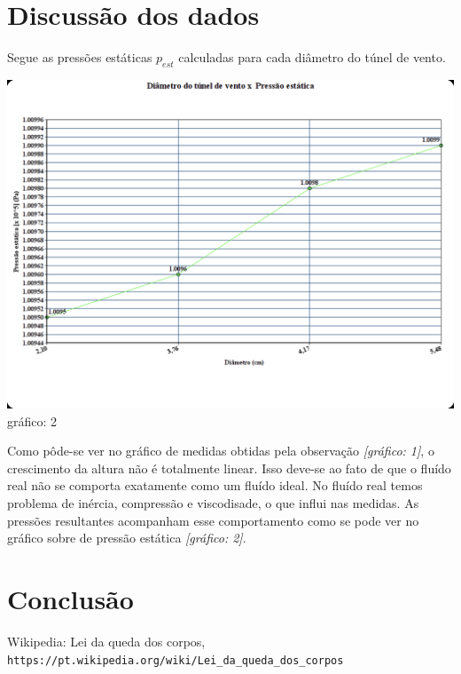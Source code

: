 \documentclass[a4paper]{article}
\begin{document}
\section{Discussão dos dados}
    Segue as pressões estáticas $p_{est}$ calculadas para cada diâmetro do túnel de vento.
        \begin{center}
              \includegraphics[width=\linewidth]{img/graphPression.png}
              \label{graph}{gráfico: 2}
        \end{center}

        Como pôde-se ver no gráfico de medidas obtidas pela observação \textit{[gráfico: 1]}, o crescimento da altura não é totalmente linear. Isso deve-se ao fato de que o fluído real não se comporta exatamente como um fluído ideal. No fluído real temos problema de inércia, compressão e viscodisade, o que influi nas medidas. As pressões resultantes acompanham esse comportamento como se pode ver no gráfico sobre de pressão estática \textit{[gráfico: 2]}.

\section{Conclusão}

\begin{thebibliography}{1}

    Wikipedia: Lei da queda dos corpos,
    \\\texttt{https://pt.wikipedia.org/wiki/Lei\_da\_queda\_dos\_corpos}
\end{thebibliography}
\end{document}
